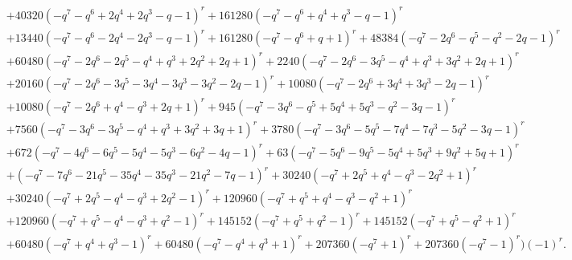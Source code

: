 \documentclass[11pt,english]{amsart}
\numberwithin{equation}{section}
\numberwithin{figure}{section}
\theoremstyle{plain}
\theoremstyle{plain}
\theoremstyle{definition}
\theoremstyle{remark}
\begin{document}
{\begin{align*}
& + 40320 {\left(-q^{7} - q^{6} + 2 q^{4} + 2 q^{3} - q - 1\right)}^{r} + 161280 {\left(-q^{7} - q^{6} + q^{4} + q^{3} - q - 1\right)}^{r} \\
& + 13440 {\left(-q^{7} - q^{6} - 2 q^{4} - 2 q^{3} - q - 1\right)}^{r} + 161280 {\left(-q^{7} - q^{6} + q + 1\right)}^{r} + 48384 {\left(-q^{7} - 2 q^{6} - q^{5} - q^{2} - 2 q - 1\right)}^{r} \\
& + 60480 {\left(-q^{7} - 2 q^{6} - 2 q^{5} - q^{4} + q^{3} + 2 q^{2} + 2 q + 1\right)}^{r} + 2240 {\left(-q^{7} - 2 q^{6} - 3 q^{5} - q^{4} + q^{3} + 3 q^{2} + 2 q + 1\right)}^{r} \\
& + 20160 {\left(-q^{7} - 2 q^{6} - 3 q^{5} - 3 q^{4} - 3 q^{3} - 3 q^{2} - 2 q - 1\right)}^{r} + 10080 {\left(-q^{7} - 2 q^{6} + 3 q^{4} + 3 q^{3} - 2 q - 1\right)}^{r} \\
& + 10080 {\left(-q^{7} - 2 q^{6} + q^{4} - q^{3} + 2 q + 1\right)}^{r} + 945 {\left(-q^{7} - 3 q^{6} - q^{5} + 5 q^{4} + 5 q^{3} - q^{2} - 3 q - 1\right)}^{r} \\
& + 7560 {\left(-q^{7} - 3 q^{6} - 3 q^{5} - q^{4} + q^{3} + 3 q^{2} + 3 q + 1\right)}^{r} + 3780 {\left(-q^{7} - 3 q^{6} - 5 q^{5} - 7 q^{4} - 7 q^{3} - 5 q^{2} - 3 q - 1\right)}^{r} \\
& + 672 {\left(-q^{7} - 4 q^{6} - 6 q^{5} - 5 q^{4} - 5 q^{3} - 6 q^{2} - 4 q - 1\right)}^{r} + 63 {\left(-q^{7} - 5 q^{6} - 9 q^{5} - 5 q^{4} + 5 q^{3} + 9 q^{2} + 5 q + 1\right)}^{r} \\
& + {\left(-q^{7} - 7 q^{6} - 21 q^{5} - 35 q^{4} - 35 q^{3} - 21 q^{2} - 7 q - 1\right)}^{r} + 30240 {\left(-q^{7} + 2 q^{5} + q^{4} - q^{3} - 2 q^{2} + 1\right)}^{r} \\
& + 30240 {\left(-q^{7} + 2 q^{5} - q^{4} - q^{3} + 2 q^{2} - 1\right)}^{r} + 120960 {\left(-q^{7} + q^{5} + q^{4} - q^{3} - q^{2} + 1\right)}^{r} \\
& + 120960 {\left(-q^{7} + q^{5} - q^{4} - q^{3} + q^{2} - 1\right)}^{r} + 145152 {\left(-q^{7} + q^{5} + q^{2} - 1\right)}^{r} + 145152 {\left(-q^{7} + q^{5} - q^{2} + 1\right)}^{r} \\
& + 60480 {\left(-q^{7} + q^{4} + q^{3} - 1\right)}^{r} + 60480 {\left(-q^{7} - q^{4} + q^{3} + 1\right)}^{r} + 207360 {\left(-q^{7} + 1\right)}^{r} + 207360 {\left(-q^{7} - 1\right)}^{r}\Biggr) \left(-1\right)^{ r}.
\end{align*}}
\end{document}
